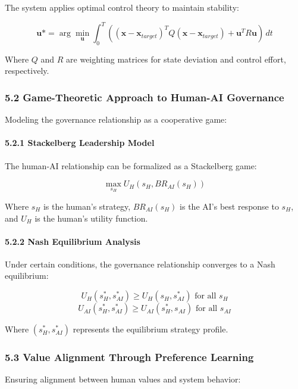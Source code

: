 \documentclass[
]{article}
\begin{document}
The system applies optimal control theory to maintain stability:

\[\mathbf{u}* = \arg\min_{\mathbf{u}} \int_0^T ((\mathbf{x} - \mathbf{x}_{target})^T Q (\mathbf{x} - \mathbf{x}_{target}) + \mathbf{u}^T R \mathbf{u}) \, dt\]

Where \(Q\) and \(R\) are weighting matrices for state deviation and
control effort, respectively.

\subsubsection{5.2 Game-Theoretic Approach to Human-AI
Governance}\label{game-theoretic-approach-to-human-ai-governance}

Modeling the governance relationship as a cooperative game:

\paragraph{5.2.1 Stackelberg Leadership
Model}\label{stackelberg-leadership-model}

The human-AI relationship can be formalized as a Stackelberg game:

\[\max_{s_H} U_H(s_H, BR_{AI}(s_H))\]

Where \(s_H\) is the human's strategy, \(BR_{AI}(s_H)\) is the AI's best
response to \(s_H\), and \(U_H\) is the human's utility function.

\paragraph{5.2.2 Nash Equilibrium
Analysis}\label{nash-equilibrium-analysis}

Under certain conditions, the governance relationship converges to a
Nash equilibrium:

\[U_H(s_H^*, s_{AI}^*) \geq U_H(s_H, s_{AI}^*) \text{ for all } s_H\]
\[U_{AI}(s_H^*, s_{AI}^*) \geq U_{AI}(s_H^*, s_{AI}) \text{ for all } s_{AI}\]

Where \((s_H^*, s_{AI}^*)\) represents the equilibrium strategy profile.

\subsubsection{5.3 Value Alignment Through Preference
Learning}\label{value-alignment-through-preference-learning}

Ensuring alignment between human values and system behavior:
\end{document}
